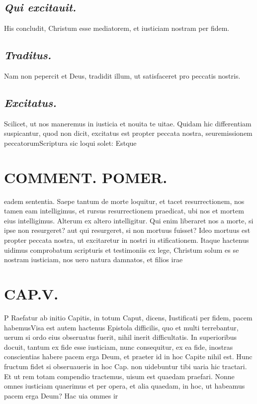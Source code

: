 \documentclass{article}
\begin{document}
\begin{pages}
\subsection*{\textit{Qui excitauit. }}\pstart His concludit, Christum esse mediatorem, et iusticiam nostram per fidem.   \pend
{}
{}
\subsection*{\textit{Traditus. }}\pstart Nam non pepercit et Deus, tradidit illum, ut satisfaceret pro peccatis nostris.   \pend
{}
{}
\subsection*{\textit{Excitatus. }}\pstart Scilicet, ut nos maneremus in iusticia et nouita te uitae. Quidam hic differentiam suspicantur, quod non dicit, excitatus est propter peccata nostra, seuremissionem peccatorumScriptura sic loqui solet: Estque   \pend
\section*{COMMENT. POMER.  }\pstart eadem sententia. Saepe tantum de morte loquitur, et tacet resurrectionem, nos tamen eam intelligimus, et rursus resurrectionem praedicat, ubi nos et mortem eius intelligimus. Alterum ex altero intelligitur. Qui enim liberaret nos a morte, si ipse non resurgeret? aut qui resurgeret, si non mortuus fuisset? Ideo mortuus est propter peccata nostra, ut excitaretur in nostri iu stificationem. Itaque hactenus uidimus comprobatum scripturis et testimoniis ex lege, Christum solum es se nostram iusticiam, nos uero natura damnatos, et filios irae\pend
\endnumbering\beginnumbering\section{CAP.V.}\pstart P  \pend\pstart Raefatur ab initio Capitis, in totum Caput, dicens, Iustificati per fidem, pacem habemusVisa est autem hactenus Epistola difficilis, quo et multi terrebantur, uerum si ordo eius obseruatus fuerit, nihil inerit difficultatis. In superioribus docuit, tantum ex fide esse iusticiam, nunc consequitur, ex ea fide, inostras conscientias habere pacem erga Deum, et praeter id in hoc Capite nihil est. Hunc fructum fidet si obseruaueris in hoc Cap. non uidebuntur tibi uaria hic tractari. Et ut rem totam compendio tractemus, uisum est quaedam praefari. Nonne omnes iusticiam quaerimus et per opera, et alia quaedam, in hoc, ut habeamus pacem erga Deum? Hac uia ommes ir\pend

\end{pages}
\end{document}
